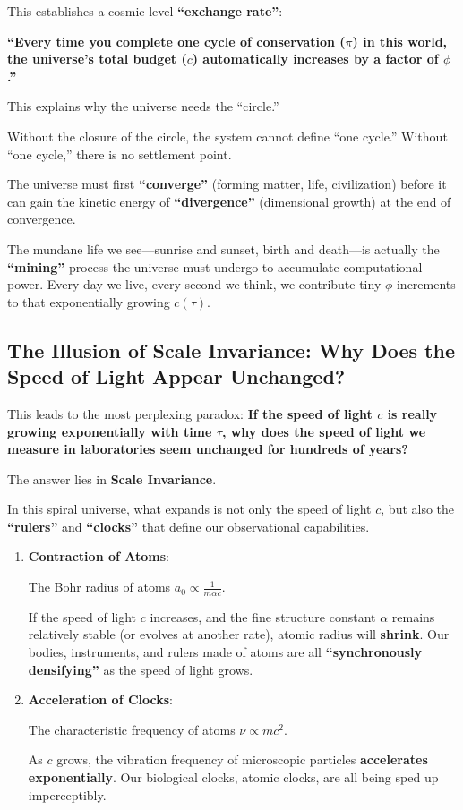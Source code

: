 This establishes a cosmic-level \textbf{``exchange rate''}:

\textbf{``Every time you complete one cycle of conservation ($\pi$) in this world, the universe's total budget ($c$) automatically increases by a factor of $\phi$.''}

This explains why the universe needs the ``circle.''

Without the closure of the circle, the system cannot define ``one cycle.'' Without ``one cycle,'' there is no settlement point.

The universe must first \textbf{``converge''} (forming matter, life, civilization) before it can gain the kinetic energy of \textbf{``divergence''} (dimensional growth) at the end of convergence.

The mundane life we see---sunrise and sunset, birth and death---is actually the \textbf{``mining''} process the universe must undergo to accumulate computational power. Every day we live, every second we think, we contribute tiny $\phi$ increments to that exponentially growing $c(\tau)$.

\subsection{The Illusion of Scale Invariance: Why Does the Speed of Light Appear Unchanged?}

This leads to the most perplexing paradox: \textbf{If the speed of light $c$ is really growing exponentially with time $\tau$, why does the speed of light we measure in laboratories seem unchanged for hundreds of years?}

The answer lies in \textbf{Scale Invariance}.

In this spiral universe, what expands is not only the speed of light $c$, but also the \textbf{``rulers''} and \textbf{``clocks''} that define our observational capabilities.

\begin{enumerate}
\item \textbf{Contraction of Atoms}:

The Bohr radius of atoms $a_0 \propto \frac{1}{m \alpha c}$.

If the speed of light $c$ increases, and the fine structure constant $\alpha$ remains relatively stable (or evolves at another rate), atomic radius will \textbf{shrink}. Our bodies, instruments, and rulers made of atoms are all \textbf{``synchronously densifying''} as the speed of light grows.

\item \textbf{Acceleration of Clocks}:

The characteristic frequency of atoms $\nu \propto m c^2$.

As $c$ grows, the vibration frequency of microscopic particles \textbf{accelerates exponentially}. Our biological clocks, atomic clocks, are all being sped up imperceptibly.
\end{enumerate}

